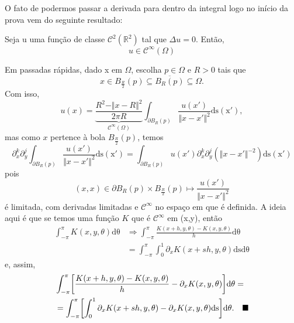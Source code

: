 \documentclass[../pde_notes.tex]{subfiles}
\begin{document}
\begin{tcolorbox}[
		skin=enhanced,
		title=Observação,
		fonttitle=\bfseries,
		colframe=black,
		colbacktitle=cyan!75!white,
		colback=cyan!15,
		colbacklower=black,
		coltitle=black,
		drop fuzzy shadow,
	]
	O fato de podermos passar a derivada para dentro da integral logo no início da prova vem do seguinte resultado:
	\begin{theorem*}
		Seja u uma função de classe \(\mathcal{C}^{2}(\mathbb{R}^{2})\) tal que \(\Delta u = 0\). Então,
		\[
			u\in \mathcal{C}^{\infty}(\Omega )
		\]
	\end{theorem*}
	\begin{proof*}
		Em passadas rápidas, dado x em \(\Omega \), escolha \(p\in \Omega \) e \(R > 0\) tais que
		\[
			x\in B_{\frac{R}{2}}(p)\subseteq \overline{B_{R}(p)} \subseteq \Omega .
		\]
		Com isso,
		\[
			u(x) = \underbrace{\frac{R^{2}-\Vert x-R \Vert^{2}}{2\pi R}}_{\mathcal{C}^{\infty}(\Omega )}\int_{\partial B_R(p)}^{}\frac{u(x')}{\Vert x-x' \Vert^{2}} \mathrm{ds(x')},
		\]
		mas como \(x\) pertence à bola \( B_{\frac{R}{2}}(p)\), temos
		\[
			\partial_{x}^{k}\partial_{y}^{j}\int_{\partial B_{R}(p)}^{}\frac{u(x')}{\Vert x-x' \Vert^{2}} \mathrm{ds(x')} = \int_{\partial B_R(p)}^{}u(x')\partial_{x}^{k}\partial_{y}^{j}(\Vert x-x' \Vert^{-2}) \mathrm{ds(x')}
		\]
		pois
		\[
			(x, x)\in \partial B_R(p)\times B_{\frac{R}{2}}(p)\mapsto \frac{u(x')}{\Vert x-x' \Vert^{2}}
		\]
		é limitada, com derivadas limitadas e \(\mathcal{C}^{\infty}\) no espaço em que é definida. A ideia aqui é que se temos uma função \(K\) que é \(\mathcal{C}^{\infty}\) em (x,y), então
		\begin{align*}
			\int_{-\pi }^{\pi }K(x, y, \theta ) \mathrm{d\theta } & \Rightarrow  \int_{-\pi }^{\pi }\frac{K(x+h, y, \theta )-K(x, y, \theta )}{h} \mathrm{d\theta } \\
			                                                      & = \int_{-\pi }^{\pi }\int_{0}^{1}\partial_x K(x+sh, y, \theta ) \mathrm{ds} \mathrm{d\theta }
		\end{align*}
		e, assim,
		\begin{align*}
			 & \int_{-\pi }^{\pi }\biggl[\frac{K(x+h, y, \theta )-K(x, y, \theta )}{h}-\partial_x K(x, y, \theta )\biggr] \mathrm{d\theta }  =                                  \\
			 & =\int_{-\pi }^{\pi }\biggl[\int_{0}^{1}\partial_x K(x+sh, y, \theta ) - \partial_x K(x, y, \theta ) \mathrm{ds}\biggr] \mathrm{d\theta }.\quad \text{$\blacksquare$}
		\end{align*}
	\end{proof*}
\end{tcolorbox}
\end{document}
